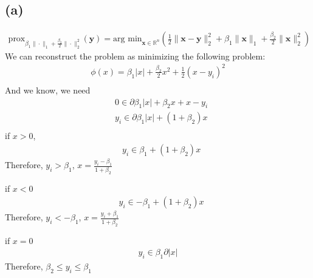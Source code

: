 \documentclass{article}
\newcommand{\R}{\mathbb{R}}
\begin{document}
\subsection*{(a)}
\begin{align*}
    \text{prox}_{\beta_1\|\cdot\|_1 + \frac{\beta_2}{2}\|\cdot\|_2^2}(\bm{y}) = \text{arg min}_{\bm{x} \in \R^n} \left( \frac{1}{2} \|\bm{x} - \bm{y}\|_2^2 + \beta_1\|\bm{x}\|_1 + \frac{\beta_2}{2} \|\bm{x}\|_2^2\right)
\end{align*}
We can reconstruct the problem as minimizing the following problem:
\begin{align*}
    \phi(x) = \beta_1 |x| + \frac{\beta_2}{2} x^2 + \frac{1}{2} (x - y_i)^2 \\
\end{align*}
And we know, we need
\begin{align*}
    &0 \in \partial \beta_1 |x| + \beta_2 x + x - y_i \\
    &y_i \in \partial \beta_1 |x| + (1 + \beta_2) x \\
\end{align*}
if \(x > 0\),
\begin{align*}
    &y_i \in \beta_1 + (1 + \beta_2) x
\end{align*}
\noindent
Therefore, \(y_i > \beta_1\), \(x = \frac{y_i - \beta_1}{1 + \beta_2}\)

\noindent
if \(x < 0\)
\begin{align*}
    &y_i \in -\beta_1 + (1 + \beta_2) x
\end{align*}
Therefore, \(y_i < -\beta_1\), \(x = \frac{y_i + \beta_1}{1 + \beta_2}\)

\noindent
if \(x = 0\)
\begin{align*}
    y_i \in \beta_1 \partial |x|
\end{align*}
Therefore, \(\beta_2 \leq y_i \leq \beta_1\)
\end{document}
